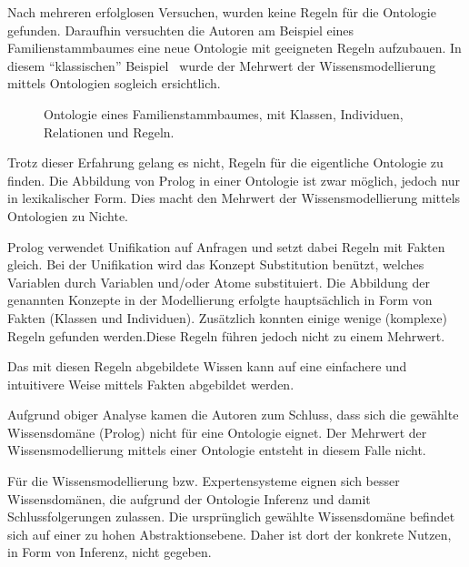 Nach mehreren erfolglosen Versuchen, wurden keine Regeln für die Ontologie gefunden. Daraufhin versuchten die Autoren am Beispiel eines Familienstammbaumes eine neue Ontologie mit geeigneten Regeln aufzubauen. In diesem ``klassischen'' Beispiel~\cite[S. 152]{laemmel} wurde der Mehrwert der Wissensmodellierung mittels Ontologien sogleich ersichtlich.

\begin{figure}[H]
\centering {}
\caption{Ontologie eines Familienstammbaumes, mit Klassen, Individuen, Relationen und Regeln.\label{fig:familien_netz}\protect\footnotemark}
\end{figure}

Trotz dieser Erfahrung gelang es nicht, Regeln für die eigentliche Ontologie zu finden. Die Abbildung von Prolog in einer Ontologie ist zwar möglich, jedoch nur in lexikalischer Form. Dies macht den Mehrwert der Wissensmodellierung mittels Ontologien zu Nichte.

Prolog verwendet Unifikation auf Anfragen und setzt dabei Regeln mit Fakten gleich. Bei der Unifikation wird das Konzept Substitution benützt, welches Variablen durch Variablen und/oder Atome substituiert. Die Abbildung der genannten Konzepte in der Modellierung erfolgte hauptsächlich in Form von Fakten (Klassen und Individuen). Zusätzlich konnten einige wenige (komplexe) Regeln gefunden werden.Diese Regeln führen jedoch nicht zu einem Mehrwert.

Das mit diesen Regeln abgebildete Wissen kann auf eine einfachere und intuitivere Weise mittels Fakten abgebildet werden.

Aufgrund obiger Analyse kamen die Autoren zum Schluss, dass sich die gewählte Wissensdomäne (Prolog) nicht für eine Ontologie eignet. Der Mehrwert der Wissensmodellierung mittels einer Ontologie entsteht in diesem Falle nicht.

Für die Wissensmodellierung bzw. Expertensysteme eignen sich besser Wissensdomänen, die aufgrund der Ontologie Inferenz und damit Schlussfolgerungen zulassen. Die ursprünglich gewählte Wissensdomäne befindet sich auf einer zu hohen Abstraktionsebene. Daher ist dort der konkrete Nutzen, in Form von Inferenz, nicht gegeben.

